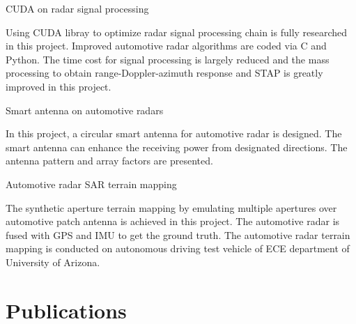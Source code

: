 \documentclass[letterpaper,9pt]{article}
\renewenvironment{itemize}{
  \begin{list}{}{
    \setlength{\topsep}{0pt}
    \setlength{\itemsep}{0pt}
    \setlength{\parsep}{0pt}
    \setlength{\partopsep}{0pt}
    \setlength{\leftmargin}{1.5em}
  }
}{\end{list}}
\begin{document}
\begin{itemize}
  \item CUDA on radar signal processing
  \begin{itemize}
    \item [$\bullet$] Using CUDA libray to optimize radar signal processing chain is fully researched in this project. Improved automotive radar algorithms are coded via C and Python. The time cost for signal processing is largely reduced and the mass processing to obtain range-Doppler-azimuth response and STAP is greatly improved in this project.
  \end{itemize}

  \item Smart antenna on automotive radars
  \begin{itemize}
    \item [$\bullet$] In this project, a circular smart antenna for automotive radar is designed. The smart antenna can enhance the receiving power from designated directions. The antenna pattern and array factors are presented.
  \end{itemize}

  \item Automotive radar SAR terrain mapping
  \begin{itemize}
    \item [$\bullet$] The synthetic aperture terrain mapping by emulating multiple apertures over automotive patch antenna is achieved in this project. The automotive radar is fused with GPS and IMU to get the ground truth. The automotive radar terrain mapping is conducted on autonomous driving test vehicle of ECE department of University of Arizona.
  \end{itemize}
\end{itemize}


\section*{Publications}



\end{document}
